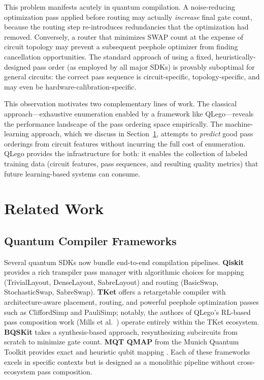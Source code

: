 \documentclass[conference]{IEEEtran}
\begin{document}
This problem manifests acutely in quantum compilation. A noise-reducing optimization pass applied before routing may actually \textit{increase} final gate count, because the routing step re-introduces redundancies that the optimization had removed. Conversely, a router that minimizes SWAP count at the expense of circuit topology may prevent a subsequent peephole optimizer from finding cancellation opportunities. The standard approach of using a fixed, heuristically-designed pass order (as employed by all major SDKs) is provably suboptimal for general circuits: the correct pass sequence is circuit-specific, topology-specific, and may even be hardware-calibration-specific.

This observation motivates two complementary lines of work. The classical approach—exhaustive enumeration enabled by a framework like QLego—reveals the performance landscape of the pass ordering space empirically. The machine-learning approach, which we discuss in Section~\ref{sec:relatedwork}, attempts to \textit{predict} good pass orderings from circuit features without incurring the full cost of enumeration. QLego provides the infrastructure for both: it enables the collection of labeled training data (circuit features, pass sequences, and resulting quality metrics) that future learning-based systems can consume.



\section{Related Work}
\label{sec:relatedwork}

\subsection{Quantum Compiler Frameworks}

Several quantum SDKs now bundle end-to-end compilation pipelines. \textbf{Qiskit} \cite{qiskit} provides a rich transpiler pass manager with algorithmic choices for mapping (TrivialLayout, DenseLayout, SabreLayout) and routing (BasicSwap, StochasticSwap, SabreSwap). \textbf{TKet} \cite{sivarajah2020tket} offers a retargetable compiler with architecture-aware placement, routing, and powerful peephole optimization passes such as CliffordSimp and PauliSimp; notably, the authors of QLego's RL-based pass composition work (Mills et al.~\cite{mills2026rl}) operate entirely within the TKet ecosystem. \textbf{BQSKit} \cite{patel2022bqskit} takes a synthesis-based approach, resynthesizing subcircuits from scratch to minimize gate count. \textbf{MQT QMAP} from the Munich Quantum Toolkit provides exact and heuristic qubit mapping \cite{mqt}. Each of these frameworks excels in specific contexts but is designed as a monolithic pipeline without cross-ecosystem pass composition.
\end{document}
